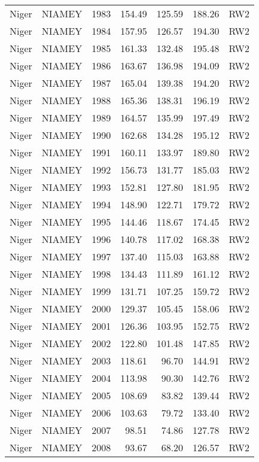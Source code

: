 \begin{longtable}{lllrrrl}
  Niger & NIAMEY & 1983 & 154.49 & 125.59 & 188.26 & RW2 \\ 
  Niger & NIAMEY & 1984 & 157.95 & 126.57 & 194.30 & RW2 \\ 
  Niger & NIAMEY & 1985 & 161.33 & 132.48 & 195.48 & RW2 \\ 
  Niger & NIAMEY & 1986 & 163.67 & 136.98 & 194.09 & RW2 \\ 
  Niger & NIAMEY & 1987 & 165.04 & 139.38 & 194.20 & RW2 \\ 
  Niger & NIAMEY & 1988 & 165.36 & 138.31 & 196.19 & RW2 \\ 
  Niger & NIAMEY & 1989 & 164.57 & 135.99 & 197.49 & RW2 \\ 
  Niger & NIAMEY & 1990 & 162.68 & 134.28 & 195.12 & RW2 \\ 
  Niger & NIAMEY & 1991 & 160.11 & 133.97 & 189.80 & RW2 \\ 
  Niger & NIAMEY & 1992 & 156.73 & 131.77 & 185.03 & RW2 \\ 
  Niger & NIAMEY & 1993 & 152.81 & 127.80 & 181.95 & RW2 \\ 
  Niger & NIAMEY & 1994 & 148.90 & 122.71 & 179.72 & RW2 \\ 
  Niger & NIAMEY & 1995 & 144.46 & 118.67 & 174.45 & RW2 \\ 
  Niger & NIAMEY & 1996 & 140.78 & 117.02 & 168.38 & RW2 \\ 
  Niger & NIAMEY & 1997 & 137.40 & 115.03 & 163.88 & RW2 \\ 
  Niger & NIAMEY & 1998 & 134.43 & 111.89 & 161.12 & RW2 \\ 
  Niger & NIAMEY & 1999 & 131.71 & 107.25 & 159.72 & RW2 \\ 
  Niger & NIAMEY & 2000 & 129.37 & 105.45 & 158.06 & RW2 \\ 
  Niger & NIAMEY & 2001 & 126.36 & 103.95 & 152.75 & RW2 \\ 
  Niger & NIAMEY & 2002 & 122.80 & 101.48 & 147.85 & RW2 \\ 
  Niger & NIAMEY & 2003 & 118.61 & 96.70 & 144.91 & RW2 \\ 
  Niger & NIAMEY & 2004 & 113.98 & 90.30 & 142.76 & RW2 \\ 
  Niger & NIAMEY & 2005 & 108.69 & 83.82 & 139.44 & RW2 \\ 
  Niger & NIAMEY & 2006 & 103.63 & 79.72 & 133.40 & RW2 \\ 
  Niger & NIAMEY & 2007 & 98.51 & 74.86 & 127.78 & RW2 \\ 
  Niger & NIAMEY & 2008 & 93.67 & 68.20 & 126.57 & RW2 \\ 

\end{longtable}
